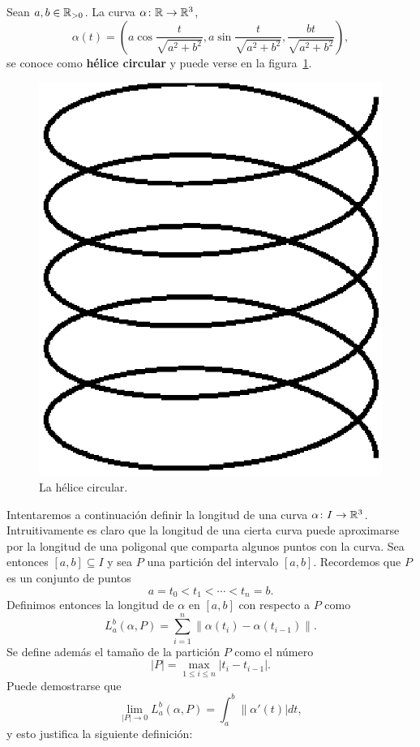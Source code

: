 \begin{example}
	\label{exa:helice}
	Sean $a,b\in\mathbb{R}_{>0}$. La curva $\alpha\colon\mathbb{R}\to\mathbb{R}^3$, 
	\[
	\alpha(t)=\left(a\cos\frac{t}{\sqrt{a^2+b^2}},a\sin\frac{t}{\sqrt{a^2+b^2}},\frac{bt}{\sqrt{a^2+b^2}}\right),
	\]
	se conoce como
	\textbf{hélice circular} y puede verse en la figura~\ref{fig:helice}.
	\begin{figure}
		\centering
    	\includegraphics[scale=0.3]{eps/helix}
		\caption{La hélice circular.}
		\label{fig:helice}
	\end{figure}
\end{example}

Intentaremos a continuación definir la longitud de una curva $\alpha\colon
I\to\mathbb{R}^3$.  Intruitivamente es claro que la longitud de una cierta curva puede
aproximarse por la longitud de una poligonal que comparta algunos puntos con la
curva.  Sea entonces $[a,b]\subseteq I$ y sea $P$ una partición del intervalo
$[a,b]$. Recordemos que $P$ es un conjunto de puntos
\[
	a=t_0<t_1<\cdots<t_n=b.
\]
Definimos entonces la longitud de $\alpha$ en $[a,b]$ con respecto a $P$ como
\[
	L_a^b(\alpha,P)=\sum_{i=1}^n\|\alpha(t_i)-\alpha(t_{i-1})\|.
\]
Se define además el tamaño de la partición $P$ como el número 
\[
	|P|=\max_{1\leq i\leq n}|t_i-t_{i-1}|.
\]
Puede demostrarse que 
\[
	\lim_{|P|\to 0}L_a^b(\alpha,P)=\int_a^b\|\alpha'(t)|dt,
\]
y esto justifica la siguiente definición:

